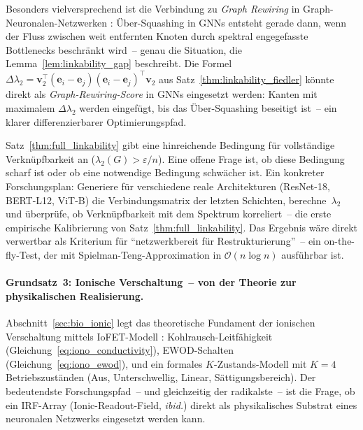 \documentclass[12pt, a4paper, openany]{report}
\begin{document}
Besonders vielversprechend ist die Verbindung zu \emph{Graph Rewiring} in
Graph-Neuronalen-Netzwerken \cite{topping22}: Über-Squashing in GNNs entsteht
gerade dann, wenn der Fluss zwischen weit entfernten Knoten durch spektral
engegefasste Bottlenecks beschränkt wird~-- genau die Situation, die
Lemma~\ref{lem:linkability_gap} beschreibt.  Die Formel
$\Delta\lambda_2 = \bm{v}_2^\top (\bm{e}_i - \bm{e}_j)(\bm{e}_i - \bm{e}_j)^\top \bm{v}_2$
aus Satz~\ref{thm:linkability_fiedler} könnte direkt als \emph{Graph-Rewiring-Score}
in GNNs eingesetzt werden: Kanten mit maximalem $\Delta\lambda_2$ werden
eingefügt, bis das Über-Squashing beseitigt ist~-- ein klarer differenzierbarer
Optimierungspfad.

Satz~\ref{thm:full_linkability} gibt eine hinreichende Bedingung für
vollständige Verknüpfbarkeit an ($\lambda_2(G) > \varepsilon / n$).  Eine
offene Frage ist, ob diese Bedingung scharf ist oder ob eine notwendige
Bedingung schwächer ist.  Ein konkreter Forschungsplan: Generiere für
verschiedene reale Architekturen (ResNet-18, BERT-L12, ViT-B) die
Verbindungsmatrix der letzten Schichten, berechne~$\lambda_2$ und überprüfe,
ob Verknüpfbarkeit mit dem Spektrum korreliert~-- die erste empirische
Kalibrierung von Satz~\ref{thm:full_linkability}.  Das Ergebnis wäre direkt
verwertbar als Kriterium für ``netzwerkbereit für Restrukturierung''~-- ein
on-the-fly-Test, der mit Spielman-Teng-Approximation
\cite{spielman11} in $\mathcal{O}(n \log n)$ ausführbar ist.

\paragraph{Grundsatz~3: Ionische Verschaltung~-- von der Theorie zur
  physikalischen Realisierung.}
Abschnitt~\ref{sec:bio_ionic} legt das theoretische Fundament der ionischen
Verschaltung mittels IoFET-Modell \cite{epp2026iono}: Kohlrausch-Leitfähigkeit
(Gleichung~\ref{eq:iono_conductivity}), EWOD-Schalten
(Gleichung~\ref{eq:iono_ewod}), und ein formales $K$-Zu\-stands-Modell mit
$K=4$ Betriebszuständen (Aus, Unterschwellig, Linear, Sättigungsbereich).
Der bedeutendste Forschungspfad~-- und gleichzeitig der radikalste~-- ist die
Frage, ob ein IRF-Array (Ionic-Readout-Field, \textit{ibid.}) direkt als
physikalisches Substrat eines neuronalen Netzwerks eingesetzt werden kann.
\end{document}
